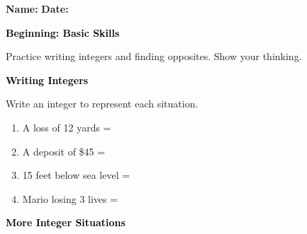\documentclass[12pt, letterpaper, fleqn]{article}
\newcommand{\blank}{\underline{\hspace{2.2cm}}}
\begin{document}
\textbf{Name:} \underline{\hspace{5cm}}
\hfill
\textbf{Date:} \underline{\hspace{3cm}}\\

\begin{tcolorbox}[colback=black!10]
    \large\textcolor{black}{\textbf{Beginning: Basic Skills}}
\end{tcolorbox}

\vspace{3mm}

\noindent
Practice writing integers and finding opposites. Show your thinking.

\vspace{4mm}

\begin{tcolorbox}[colback=black!10]
\large\textcolor{black}{\textbf{Writing Integers}}
\end{tcolorbox}

\noindent
Write an integer to represent each situation.

\vspace{3mm}
\begin{enumerate}[itemsep=0.5cm, leftmargin=0.6cm]
\item A loss of 12 yards = \blank

\vspace{2cm}

\item A deposit of \$45 = \blank

\vspace{2cm}

\item 15 feet below sea level = \blank

\vspace{2cm}

\item Mario losing 3 lives = \blank

\vspace{2cm}

\end{enumerate}

\newpage

\begin{tcolorbox}[colback=black!10]
\large\textcolor{black}{\textbf{More Integer Situations}}
\end{tcolorbox}
\end{document}
